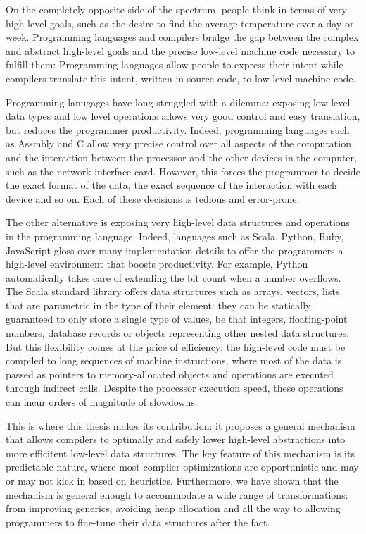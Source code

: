 On the completely opposite side of the spectrum, people think in terms of very high-level goals, such as the desire to find the average temperature over a day or week. Programming languages and compilers bridge the gap between the complex and abstract high-level goals and the precise low-level machine code necessary to fulfill them: Programming languages allow people to express their intent while compilers translate this intent, written in source code, to low-level machine code.

Programming lanugages have long struggled with a dilemma: exposing low-level data types and low level operations allows very good control and easy translation, but reduces the programmer productivity. Indeed, programming languages such as Assmbly and C allow very precise control over all aspects of the computation and the interaction between the processor and the other devices in the computer, such as the network interface card. However, this forces the programmer to decide the exact format of the data, the exact sequence of the interaction with each device and so on. Each of these decisions is tedious and error-prone.

The other alternative is exposing very high-level data structures and operations in the programming language. Indeed, languages such as Scala, Python, Ruby, JavaScript gloss over many implementation details to offer the programmers a high-level environment that boosts productivity. For example, Python automatically takes care of extending the bit count when a number overflows. The Scala standard library offers data structures such as arrays, vectors, lists that are parametric in the type of their element: they can be statically guaranteed to only store a single type of values, be that integers, floating-point numbers, database records or objects representing other nested data structures. But this flexibility comes at the price of efficiency: the high-level code must be compiled to long sequences of machine instructions, where most of the data is passed as pointers to memory-allocated objects and operations are executed through indirect calls. Despite the processor execution speed, these operations can incur orders of magnitude of slowdowns.

This is where this thesis makes its contribution: it proposes a general mechanism that allows compilers to optimally and safely lower high-level abstractions into more efficitent low-level data structures. The key feature of this mechanism is its predictable nature, where most compiler optimizations are opportunistic and may or may not kick in based on heuristics. Furthermore, we have shown that the mechanism is general enough to accommodate a wide range of transformations: from improving generics, avoiding heap allocation and all the way to allowing programmers to fine-tune their data structures after the fact.

